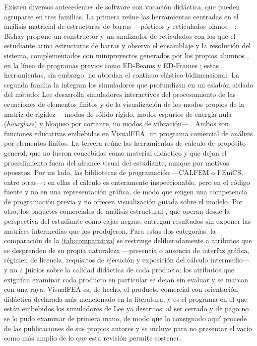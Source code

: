 Existen diversos antecedentes de software con vocación didáctica, que pueden agruparse en tres familias. La primera reúne las herramientas centradas en el análisis matricial de estructuras de barras —pórticos y reticulados planos—: Bishay propone un constructor y un analizador de reticulados con los que el estudiante arma estructuras de barras y observa el ensamblaje y la resolución del sistema, complementados con miniproyectos generados por los propios alumnos \autocite{bishay2020teaching}, en la línea de programas previos como ED-Beams y ED-Frames \autocite{suarez1998edelas2d}; estas herramientas, sin embargo, no abordan el continuo elástico bidimensional. La segunda familia la integran los simuladores que profundizan en un eslabón aislado del método: Lee desarrolla simuladores interactivos del procesamiento de las ecuaciones de elementos finitos \autocite{lee2015interactive} y de la visualización de los modos propios de la matriz de rigidez —modos de sólido rígido, modos espurios de energía nula (\emph{hourglass}) y bloqueo por cortante, no modos de vibración— \autocite{lee2015eigenmodes}. Ambos son funciones educativas embebidas en VisualFEA, un programa comercial de análisis por elementos finitos. La tercera reúne las herramientas de cálculo de propósito general, que no fueron concebidas como material didáctico y que dejan el procedimiento fuera del alcance visual del estudiante, aunque por motivos opuestos. Por un lado, las bibliotecas de programación —CALFEM o FEniCS, entre otras—: en ellas el cálculo es enteramente inspeccionable, pero en el código fuente y no en una representación gráfica, de modo que exigen una competencia de programación previa y no ofrecen visualización guiada sobre el modelo. Por otro, los paquetes comerciales de análisis estructural \autocite{csi2017sap2000}, que operan desde la perspectiva del estudiante como cajas negras: entregan resultados sin exponer las matrices intermedias que los produjeron. Para estas dos categorías, la comparación de la \autoref{tab:comparativa} se restringe deliberadamente a atributos que se desprenden de su propia naturaleza —presencia o ausencia de interfaz gráfica, régimen de licencia, requisitos de ejecución y exposición del cálculo intermedio— y no a juicios sobre la calidad didáctica de cada producto; los atributos que exigirían examinar cada producto en particular se dejan sin evaluar y se marcan con una raya. VisualFEA es, de hecho, el producto comercial con orientación didáctica declarada más mencionado en la literatura, y es el programa en el que están embebidos los simuladores de Lee ya descritos; al ser cerrado y de pago no se lo pudo examinar de primera mano, de modo que lo consignado aquí procede de las publicaciones de sus propios autores y se incluye para no presentar el vacío como más amplio de lo que esta revisión permite sostener.

